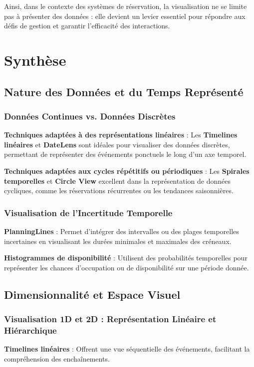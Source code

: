 \documentclass[runningheads]{llncs}
\begin{document}
Ainsi, dans le contexte des systèmes de réservation, la visualisation ne se limite pas à présenter des données : elle devient un levier essentiel pour répondre aux défis de gestion et garantir l’efficacité des interactions.

\section{Synthèse}

\subsection{Nature des Données et du Temps Représenté}

\subsubsection{Données Continues vs. Données Discrètes}
\textbf{Techniques adaptées à des représentations linéaires} : Les \textbf{Timelines linéaires} et \textbf{DateLens} sont idéales pour visualiser des données discrètes, permettant de représenter des événements ponctuels le long d'un axe temporel.

\textbf{Techniques adaptées aux cycles répétitifs ou périodiques} : Les \textbf{Spirales temporelles} et \textbf{Circle View} excellent dans la représentation de données cycliques, comme les réservations récurrentes ou les tendances saisonnières.

\subsubsection{Visualisation de l'Incertitude Temporelle}
\textbf{PlanningLines} : Permet d'intégrer des intervalles ou des plages temporelles incertaines en visualisant les durées minimales et maximales des créneaux.

\textbf{Histogrammes de disponibilité} : Utilisent des probabilités temporelles pour représenter les chances d'occupation ou de disponibilité sur une période donnée.

\subsection{Dimensionnalité et Espace Visuel}

\subsubsection{Visualisation 1D et 2D : Représentation Linéaire et Hiérarchique}
\textbf{Timelines linéaires} : Offrent une vue séquentielle des événements, facilitant la compréhension des enchaînements.
\end{document}

